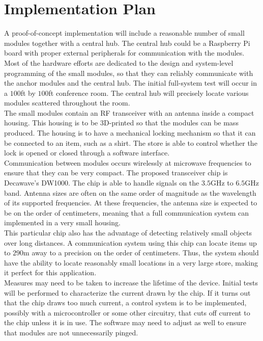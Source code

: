 \documentclass{article}
\begin{document}
\section{Implementation Plan}
A proof-of-concept implementation will include a reasonable number of small modules together with a central hub.
The central hub could be a Raspberry Pi board with proper external peripherals for communication with the modules.
Most of the hardware efforts are dedicated to the design and system-level programming of the small modules, so that they can reliably communicate with the anchor modules and the central hub.
The initial full-system test will occur in a $100$ft by $100$ft conference room.
The central hub will precisely locate various modules scattered throughout the room. \\

The small modules contain an RF transceiver with an antenna inside a compact housing.
This housing is to be 3D-printed so that the modules can be mass produced.
The housing is to have a mechanical locking mechanism so that it can be connected to an item, such as a shirt.
The store is able to control whether the lock is opened or closed through a software interface. \\

Communication between modules occurs wirelessly at microwave frequencies to ensure that they can be very compact.
The proposed transceiver chip is Decawave's DW1000.
The chip is able to handle signals on the $3.5$\si{\giga\hertz} to $6.5$\si{\giga\hertz} band.
Antenna sizes are often on the same order of magnitude as the wavelength of its supported frequencies.
At these frequencies, the antenna size is expected to be on the order of centimeters, meaning that a full communication system can implemented in a very small housing. \\

This particular chip also has the advantage of detecting relatively small objects over long distances.
A communication system using this chip can locate items up to $290$\si{\meter} away to a precision on the order of centimeters.
Thus, the system should have the ability to locate reasonably small locations in a very large store, making it perfect for this application. \\

Measures may need to be taken to increase the lifetime of the device.
Initial tests will be performed to characterize the current drawn by the chip.
If it turns out that the chip draws too much current, a control system is to be implemented, possibly with a microcontroller or some other circuitry, that cuts off current to the chip unless it is in use.
The software may need to adjust as well to ensure that modules are not unnecessarily pinged. \\
\end{document}
